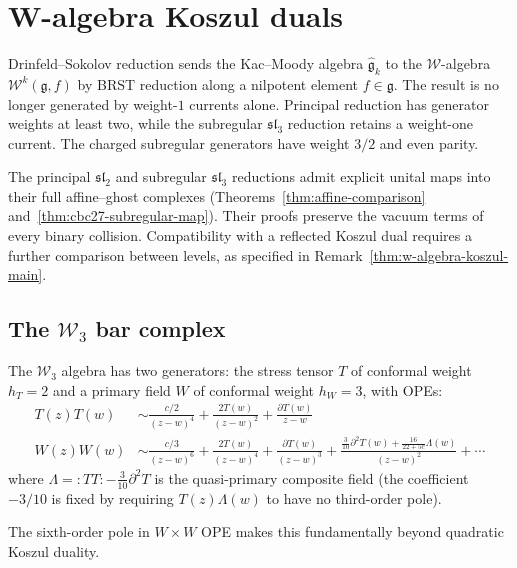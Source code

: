 \chapter{W-algebra Koszul duals}\label{chap:w-algebra-koszul}
\label{chap:w-algebras}


Drinfeld--Sokolov reduction \cite{DS, FF} sends the Kac--Moody algebra
$\widehat{\mathfrak{g}}_k$ to the $\mathcal{W}$-algebra
$\mathcal{W}^k(\mathfrak{g}, f)$ by BRST reduction along a nilpotent
element $f \in \mathfrak{g}$.  The result is no longer generated by
weight-$1$ currents alone.
Principal reduction has generator weights at least two, while the subregular
$\mathfrak{sl}_3$ reduction retains a weight-one current.
The charged subregular generators have weight $3/2$ and even parity.


The principal $\mathfrak{sl}_2$ and subregular $\mathfrak{sl}_3$ reductions admit explicit unital maps into their full affine--ghost complexes
(Theorems~\ref{thm:affine-comparison} and~\ref{thm:cbc27-subregular-map}).
Their proofs preserve the vacuum terms of every binary collision.
Compatibility with a reflected Koszul dual requires a further comparison between levels, as specified in Remark~\ref{thm:w-algebra-koszul-main}.

\section{The $\mathcal{W}_3$ bar complex}

\begin{example}\label{ex:w3-ope-structure}
The $\mathcal{W}_3$ algebra has two generators: the stress tensor $T$ of conformal weight $h_T = 2$ and a primary field $W$ of conformal weight $h_W = 3$, with OPEs:
\begin{align}
T(z)T(w) &\sim \frac{c/2}{(z-w)^4} + \frac{2T(w)}{(z-w)^2} + \frac{\partial T(w)}{z-w} \\
W(z)W(w) &\sim \frac{c/3}{(z-w)^6} + \frac{2T(w)}{(z-w)^4} + \frac{\partial T(w)}{(z-w)^3} + \frac{\frac{3}{10}\partial^2 T(w) + \frac{16}{22+5c}\Lambda(w)}{(z-w)^2} + \cdots
\end{align}
where $\Lambda = {:}TT{:} - \frac{3}{10}\partial^2 T$ is the quasi-primary composite field (the coefficient $-3/10$ is fixed by requiring $T(z)\Lambda(w)$ to have no third-order pole).

The sixth-order pole in $W \times W$ OPE makes this fundamentally beyond quadratic Koszul duality.
\end{example}



